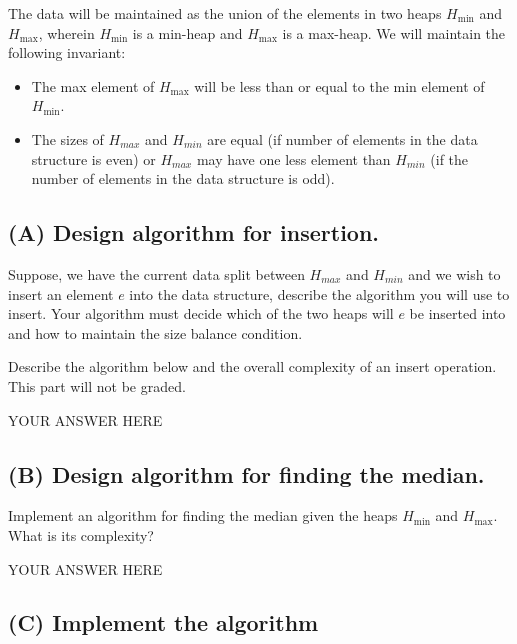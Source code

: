 \documentclass[
]{article}
\providecommand{\tightlist}{%
  \setlength{\itemsep}{0pt}\setlength{\parskip}{0pt}}
\begin{document}
The data will be maintained as the union of the elements in two heaps
\(H_{\min}\) and \(H_{\max}\), wherein \(H_{\min}\) is a min-heap and
\(H_{\max}\) is a max-heap. We will maintain the following invariant:

\begin{itemize}
\tightlist
\item
  The max element of \(H_{\max}\) will be less than or equal to the min
  element of \(H_{\min}\).
\item
  The sizes of \(H_{max}\) and \(H_{min}\) are equal (if number of
  elements in the data structure is even) or \(H_{max}\) may have one
  less element than \(H_{min}\) (if the number of elements in the data
  structure is odd).
\end{itemize}

\hypertarget{a-design-algorithm-for-insertion}{%
\subsection{(A) Design algorithm for
insertion.}\label{a-design-algorithm-for-insertion}}

Suppose, we have the current data split between \(H_{max}\) and
\(H_{min}\) and we wish to insert an element \(e\) into the data
structure, describe the algorithm you will use to insert. Your algorithm
must decide which of the two heaps will \(e\) be inserted into and how
to maintain the size balance condition.

Describe the algorithm below and the overall complexity of an insert
operation. This part will not be graded.

YOUR ANSWER HERE

\hypertarget{b-design-algorithm-for-finding-the-median}{%
\subsection{(B) Design algorithm for finding the
median.}\label{b-design-algorithm-for-finding-the-median}}

Implement an algorithm for finding the median given the heaps
\(H_{\min}\) and \(H_{\max}\). What is its complexity?

YOUR ANSWER HERE

\hypertarget{c-implement-the-algorithm}{%
\subsection{(C) Implement the
algorithm}\label{c-implement-the-algorithm}}
\end{document}
